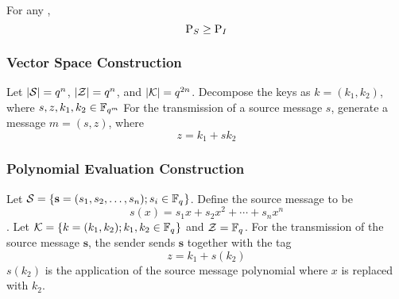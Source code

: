 \begin{theorem}\label{thm:Bounds_Systematic_Authentication_Code}
  For any ,
  \begin{equation}\label{eq:Bounds_Systematic_Authentication_Code}
    \operatorname{\operatorname{P}}_{S} \geq \operatorname{\operatorname{P}}_{I}
  \end{equation}
\end{theorem}

\subsubsection{Vector Space Construction}\label{subsubsec:Systematic_Authentication_Code-Vector_Space}
Let $\lvert \operatorname{\mathcal{S}} \rvert = q^{n}$, $\lvert \operatorname{\mathcal{Z}} \rvert = q^{n}$, and $\lvert \operatorname{\mathcal{K}} \rvert = q^{2n}$.
Decompose the keys as $k = (k_{1}, k_{2})$, where $s, z, k_{1}, k_{2} \in \mathbb{F}_{q^{m}}$
For the transmission of a source message $s$, generate a message $m = (s, z)$, where
\begin{equation*}
  z = k_{1} + sk_{2}
\end{equation*}

\subsubsection{Polynomial Evaluation Construction}\label{subsubsec:Systematic_Authentication_Code-Polynomial_Evaluation}
Let $\operatorname{\mathcal{S}} = \lbrace \mathbf{s} = (s_{1}, s_{2}, \ldots, s_{n}); s_{i} \in \mathbb{F}_{q^{}} \rbrace$.
Define the source message  to be
\begin{equation*}
  s(x) = s_{1}x + s_{2}x^{2} + \cdots + s_{n}x^{n}
\end{equation*}.
Let $\operatorname{\mathcal{K}} = \lbrace k = (k_{1}, k_{2}); k_{1}, k_{2} \in \mathbb{F}_{q^{}} \rbrace$ and $\operatorname{\mathcal{Z}} = \mathbb{F}_{q^{}}$.
For the transmission of the source message $\mathbf{s}$, the sender sends $\mathbf{s}$ together with the tag
\begin{equation*}
  z = k_{1} + s(k_{2})
\end{equation*}
$s(k_{2})$ is the application of the source message polynomial where $x$ is replaced with $k_{2}$.


